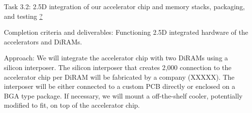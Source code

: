 Task 3.2: 2.5D integration of our accelerator chip and memory stacks, packaging, and testing \underline{?}

   Completion criteria and deliverables: Functioning 2.5D integrated hardware of the accelerators and DiRAMs. 

   Approach:  We will integrate the accelerator chip with two DiRAMs using a silicon interposer. The silicon interposer that creates 2,000 connection to the accelerator chip per DiRAM will be fabricated by a company (XXXXX). The interposer will be either connected to a custom PCB directly or enclosed on a BGA type package. If necessary, we will mount a off-the-shelf cooler, potentially modified to fit, on top of the accelerator chip. 
